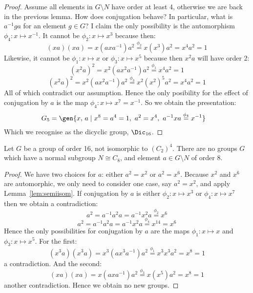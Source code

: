 \begin{proof}
    Assume all elements in \(G\setminus N\) have order at least 4, otherwise we are back in the previous lemma.
    How does conjugation behave?
    In particular, what is \(a^{-1}ga\) for an element \(g \in G\)?
    I claim the only possibility is the automorphism \(\phi_4:x\mapsto x^{-1}\).
    It cannot be \(\phi_2:x\mapsto x^3\) because then:
    \[(xa)(xa) = x(axa^{-1})a^2 \overset{\phi_2}{=} x(x^3) a^2 = x^4 a^2 = 1\]
    Likewise, it cannot be \(\phi_1:x\mapsto x\) or \(\phi_3:x\mapsto x^5\) because then \(x^2 a\) will have order 2:
    \[{(x^2 a)}^2 = x^2 (ax^2 a^{-1})a^2 \overset{\phi_1}{=} x^4 a^2 = 1\]
    \[{(x^2 a)}^2 = x^2 (ax^2 a^{-1})a^2 \overset{\phi_3}{=} x^2 {(x^2)}^5 a^2 = x^4 a^2 = 1\]
    All of which contradict our assumption.
    Hence the only posibility for the effect of conjugation by \(a\) is the map \(\phi_4:x\mapsto x^7 = x^{-1}\).
    So we obtain the presentation:
    \begin{align*}
        G_5 &= \gen{x,\,a \mid x^8 = a^4 = 1,\ a^2 = x^4,\ a^{-1}xa \overset{\phi_4}{=} x^{-1}}
    \end{align*}
    Which we recognise as the dicyclic group, \(\Dic_{16}\).
\end{proof}

\begin{lemma}
    Let \(G\) be a group of order 16, not isomorphic to \({(C_{2})}^4\).
    There are no groups \(G\) which have a normal subgroup \(N \cong C_8\), and element \(a \in G\setminus N\) of order 8.
\end{lemma}

\begin{proof}
    We have two choices for \(a\): either \(a^2 = x^2\) or \(a^2 = x^6\).
    Because \(x^2\) and \(x^6\) are automorphic, we only need to consider one case, say \(a^2 = x^2\), and apply
    Lemma~\ref{lem:semiisom}.
    If conjugation by \(a\) is either \(\phi_2:x\mapsto x^3\) or \(\phi_4:x\mapsto x^7\) then we obtain a
    contradiction:
    \[a^2 = a^{-1}a^2 a = a^{-1}x^2 a \overset{\phi_2}{=} x^6\]
    \[a^2 = a^{-1}a^2 a = a^{-1}x^2 a \overset{\phi_4}{=} x^{14} = x^6\]
    Hence the only possibilities for conjugation by \(a\) are the maps \(\phi_1:x\mapsto x\) and \(\phi_3:x \mapsto
    x^5\).
    For the first:
    \[(x^3 a)(x^3 a) = x^3(ax^3 a^{-1})a^2 \overset{\phi_1}{=} x^3 x^3 a^2 = x^8 = 1\]
    a contradiction.
    And the second:
    \[(xa)(xa) = x(axa^{-1})a^2 \overset{\phi_3}{=} x(x^5)a^2 = x^8 = 1\]
    another contradiction.
    Hence we obtain no new groups.
\end{proof}

